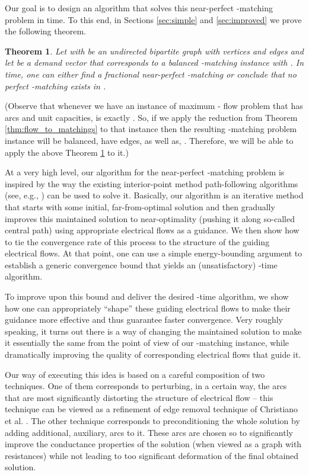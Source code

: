 \documentclass[11pt, letterpaper]{article}
\newtheorem{theorem}{Theorem}[section]
\begin{document}
Our goal is to design an algorithm that solves this near-perfect -matching problem in  time. To this end, 
in Sections \ref{sec:simple} and \ref{sec:improved} we prove the following theorem. 

\begin{theorem}\label{thm:interior_point_matchings}
Let  with  be an undirected bipartite graph with  vertices and  edges and let  be a demand vector that corresponds to a balanced -matching instance with . In  time, one can either find a fractional near-perfect -matching  or conclude that no perfect -matching exists in . 
\end{theorem}

(Observe that whenever we have an instance of maximum - flow problem that has  arcs and unit capacities,  is exactly . So, if we apply the reduction from Theorem \ref{thm:flow_to_matchings} to that instance then the resulting -matching problem instance will be balanced, have  edges, as well as, . Therefore, we will be able to apply the above Theorem \ref{thm:interior_point_matchings} to it.)




At a very high level, our algorithm for the near-perfect -matching problem is inspired by the way the existing interior-point method path-following algorithms  (see, e.g., \cite{Ye97,Wright97,BoydV04}) can be used to solve it. Basically, our algorithm is an iterative method that starts with some initial, far-from-optimal solution and then gradually improves this maintained solution to near-optimality (pushing it along so-called central path)  using appropriate electrical flows as a guidance. We then show how to tie the convergence rate of this process to the structure of the guiding electrical flows. At that point, one can use a simple energy-bounding argument to establish a generic convergence bound that yields an (unsatisfactory) -time algorithm.

To improve upon this bound and deliver the desired -time algorithm, we show how one can appropriately ``shape'' these guiding electrical flows to make their guidance more effective and thus guarantee faster convergence. Very roughly speaking, it turns out there is a way of changing the maintained solution to make it essentially the same from the point of view of our -matching instance, while dramatically improving the quality of corresponding electrical flows that guide it. 

Our way of executing this idea is based on a careful composition of two techniques. One of them  corresponds to perturbing, in a certain way, the arcs that are most significantly distorting the structure of electrical flow -- this technique can be viewed as a refinement of edge removal technique of Christiano et al. \cite{ChristianoKMST11}. The other technique corresponds to preconditioning the whole solution by adding additional, auxiliary, arcs to it. These arcs are chosen so to significantly improve the conductance properties of the solution (when viewed as a graph with resistances) while not leading to too significant deformation of the final obtained solution. 
\end{document}
